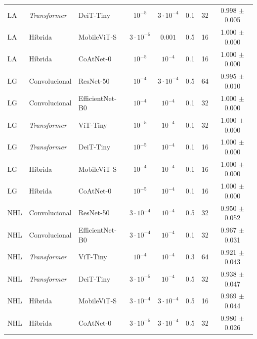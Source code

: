 \begin{table}[htb]
{\begin{tabular}{lllccccc}
LA & \textit{Transformer} & DeiT-Tiny & $10^{-5}$ & $3\cdot 10^{-4}$ & 0.1 & 32 & 0.998 $\pm$ 0.005 \\
LA & Híbrida & MobileViT-S & $3\cdot 10^{-5}$ & $0.001$ & 0.5 & 16 & 1.000 $\pm$ 0.000 \\
LA & Híbrida & CoAtNet-0 & $10^{-5}$ & $10^{-4}$ & 0.1 & 16 & 1.000 $\pm$ 0.000 \\
\midrule
LG & Convolucional & ResNet-50 & $10^{-4}$ & $3\cdot 10^{-4}$ & 0.5 & 64 & 0.995 $\pm$ 0.010 \\
LG & Convolucional & EfficientNet-B0 & $10^{-4}$ & $10^{-4}$ & 0.1 & 32 & 1.000 $\pm$ 0.000 \\
LG & \textit{Transformer} & ViT-Tiny & $10^{-5}$ & $10^{-4}$ & 0.1 & 32 & 1.000 $\pm$ 0.000 \\
LG & \textit{Transformer} & DeiT-Tiny & $10^{-5}$ & $10^{-4}$ & 0.1 & 16 & 1.000 $\pm$ 0.000 \\
LG & Híbrida & MobileViT-S & $10^{-4}$ & $10^{-4}$ & 0.1 & 16 & 1.000 $\pm$ 0.000 \\
LG & Híbrida & CoAtNet-0 & $10^{-5}$ & $10^{-4}$ & 0.1 & 16 & 1.000 $\pm$ 0.000 \\
\midrule
NHL & Convolucional & ResNet-50 & $3\cdot 10^{-4}$ & $10^{-4}$ & 0.5 & 32 & 0.950 $\pm$ 0.052 \\
NHL & Convolucional & EfficientNet-B0 & $3\cdot 10^{-4}$ & $10^{-4}$ & 0.1 & 32 & 0.967 $\pm$ 0.031 \\
NHL & \textit{Transformer} & ViT-Tiny & $10^{-4}$ & $10^{-4}$ & 0.3 & 64 & 0.921 $\pm$ 0.043 \\
NHL & \textit{Transformer} & DeiT-Tiny & $3\cdot 10^{-5}$ & $10^{-4}$ & 0.5 & 32 & 0.938 $\pm$ 0.047 \\
NHL & Híbrida & MobileViT-S & $3\cdot 10^{-4}$ & $3\cdot 10^{-4}$ & 0.5 & 16 & 0.969 $\pm$ 0.044 \\
NHL & Híbrida & CoAtNet-0 & $3\cdot 10^{-5}$ & $3\cdot 10^{-4}$ & 0.5 & 32 & 0.980 $\pm$ 0.026 \\
\bottomrule
\end{tabular}%
}
\end{table}
